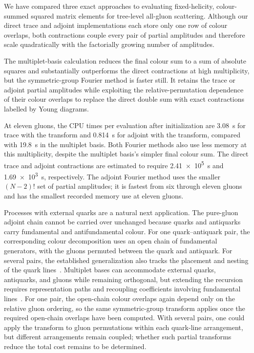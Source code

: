 \documentclass[aps,prd,twocolumn,superscriptaddress,nofootinbib]{revtex4-2}
\begin{document}
We have compared three exact approaches to evaluating fixed-helicity,
colour-summed squared matrix elements for tree-level all-gluon scattering.
Although our direct trace and adjoint implementations each store only one row
of colour overlaps, both contractions couple every pair of partial amplitudes
and therefore scale quadratically with the factorially growing number of
amplitudes.

The multiplet-basis calculation reduces the final colour sum to a sum of
absolute squares and substantially outperforms the direct contractions at
high multiplicity, but the symmetric-group Fourier method is faster still.
It retains the trace or adjoint partial amplitudes while exploiting the
relative-permutation dependence of their colour overlaps to replace the
direct double sum with exact contractions labelled by Young diagrams.

At eleven gluons, the CPU times per evaluation after initialization are
\SI{3.08}{s} for trace with the transform and \SI{0.814}{s} for adjoint with
the transform, compared with \SI{19.8}{s} in the multiplet basis.  Both
Fourier methods also use less memory at this multiplicity, despite the
multiplet basis's simpler final colour sum.  The direct trace and adjoint
contractions are estimated to require \SI{2.41e5}{s} and \SI{1.69e3}{s},
respectively.  The adjoint Fourier method uses the smaller $(N-2)!$ set
of partial amplitudes; it is fastest from six through eleven gluons and has
the smallest recorded memory use at eleven gluons.

Processes with external quarks are a natural next application.  The
pure-gluon adjoint chain cannot be carried over unchanged because quarks and
antiquarks carry fundamental and antifundamental colour.  For one
quark--antiquark pair, the corresponding colour decomposition uses an open
chain of fundamental generators, with the gluons permuted between the quark
and antiquark.  For several pairs, the established generalization also tracks
the placement and nesting of the quark
lines~\cite{Johansson:2015oia,Melia:2015ika}.  Multiplet bases can accommodate
external quarks, antiquarks, and gluons while remaining orthogonal, but
extending the recursion requires representation paths and recoupling
coefficients involving fundamental
lines~\cite{Sjodahl:2018cca,Alcock-Zeilinger:2022hrk,Keppeler:2023msu}.  For
one pair, the open-chain colour overlaps again depend only on the relative
gluon ordering, so the same symmetric-group transform applies once the
required open-chain overlaps have been computed.  With several pairs, one
could apply the transform to gluon permutations within each quark-line
arrangement, but different arrangements remain coupled; whether such partial
transforms reduce the total cost remains to be determined.



\end{document}
